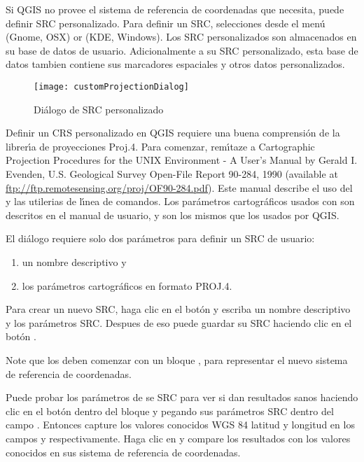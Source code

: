 Si QGIS no provee el sistema de referencia de coordenadas que necesita, puede
definir SRC personalizado. Para definir un SRC, selecciones
 desde el men\'u  
(Gnome, OSX) or  (KDE, Windows).
Los SRC personalizados son almacenados en su base de datos de usuario. Adicionalmente a su
SRC personalizado, esta base de datos tambien contiene sus marcadores espaciales y otros datos personalizados. 

\begin{figure}[ht]
   \begin{center}
   \caption{Di\'alogo de SRC personalizado \nixcaption}\label{fig:customprojections}\smallskip
   \texttt{[image: customProjectionDialog]}
\end{center}  
\end{figure}

Definir un CRS personalizado en QGIS requiere una buena comprensi\'on de la
librer\'{\i}a de proyecciones Proj.4. Para comenzar, rem\'{\i}taze a Cartographic Projection Procedures
for the UNIX Environment - A User's Manual by Gerald I. Evenden, U.S.
Geological Survey Open-File Report 90-284, 1990 (available at \url{ftp://ftp.remotesensing.org/proj/OF90-284.pdf}).
Este manual describe el uso del  y las utilerias de
l\'{\i}nea de comandos. Los par\'ametros cartogr\'aficos usados con  son
descritos en el manual de usuario, y son los mismos que los usados por QGIS. 

El di\'alogo  requiere
solo dos par\'ametros para definir un SRC de usuario: 
\begin{enumerate}
\item un nombre descriptivo y
\item los par\'ametros cartogr\'aficos en formato PROJ.4.
\end{enumerate}
Para crear un nuevo SRC, haga clic en el bot\'on  y escriba un
nombre descriptivo y los par\'ametros SRC. Despues de eso puede guardar su SRC haciendo clic
en el bot\'on .

Note que los  deben comenzar con un bloque ,
para representar el nuevo sistema de referencia de coordenadas.

Puede probar los par\'ametros de se SRC para ver si dan resultados sanos
haciendo clic en el bot\'on  dentro del bloque  
y pegando sus par\'ametros SRC dentro del
campo . Entonces capture los valores conocidos WGS 84 latitud y longitud
en los campos  y  respectivamente. 
Haga clic en  y compare los resultados con los valores conocidos en
sus sistema de referencia de coordenadas. 

